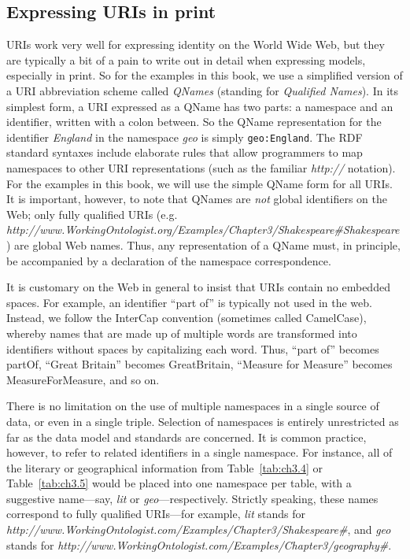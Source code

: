 \subsection{Expressing URIs in print}

URIs work very well for expressing identity on the World Wide Web, but
they are typically a bit of a pain to write out in detail when
expressing models, especially in print. So for the examples in this
book, we use a simplified version of a URI abbreviation scheme called
\emph{QNames} (standing for \emph{Qualified Names}). In its simplest form, a
URI expressed as a QName has two parts: a namespace and an identifier,
written with a colon between. So the QName representation for the
identifier \emph{England} in the namespace \emph{geo} is simply \texttt{geo:England}.
The RDF standard syntaxes include elaborate rules that allow programmers
to map namespaces to other URI representations (such as the familiar
\emph{http://} notation). For the examples in this book, we will use the
simple QName form for all URIs. It is important, however, to note that
QNames are \emph{not} global identifiers on the Web; only fully
qualified URIs (e.g.
\emph{http://www.WorkingOntologist.org/Examples/Chapter3/Shakespeare\#Shakespeare})
are global Web names. Thus, any representation of a QName must, in
principle, be accompanied by a declaration of the namespace
correspondence.

It is customary on the Web in general
to insist that URIs contain no embedded spaces. For example, an
identifier ``part of'' is typically not used in the web. Instead, we
follow the InterCap convention (sometimes called CamelCase), whereby
names that are made up of multiple words are transformed into
identifiers without spaces by capitalizing each word. Thus, ``part of''
becomes partOf, ``Great Britain'' becomes GreatBritain, ``Measure for
Measure'' becomes MeasureForMeasure, and so on.

There is no limitation on the use of multiple namespaces in a single
source of data, or even in
a single triple. Selection of namespaces is entirely unrestricted as far
as the data model and standards are concerned. It is common practice,
however, to refer to related identifiers in a single namespace. For
instance, all of the literary or geographical information from Table~\ref{tab:ch3.4}
or Table~\ref{tab:ch3.5} would be placed into one namespace per table, with a
suggestive name---say, \emph{lit} or \emph{geo}---respectively. Strictly
speaking, these names correspond to fully qualified URIs---for example,
\emph{lit} stands for \emph{http://www.WorkingOntologist.com/Examples/Chapter3/Shakespeare\#}, and
\emph{geo} stands for \emph{http://www.WorkingOntologist.com/Examples/Chapter3/geography\#}.


